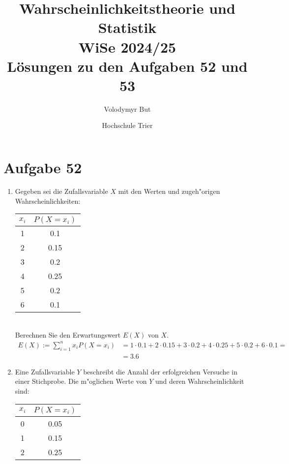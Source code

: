 \documentclass[10pt, oneside]{article}
\title{Wahrscheinlichkeitstheorie und Statistik\\[10pt]\Large{WiSe 2024/25}\\[15pt]\Large{L{\"o}sungen zu den Aufgaben 52 und 53}}
\author{Volodymyr But}
\date{Hochschule Trier}
\begin{document}
\sloppy

\maketitle
\vspace{25px}

\section{Aufgabe 52}

\begin{enumerate}
    \item Gegeben sei die Zufallsvariable $X$ mit den Werten und zugeh"origen Wahrscheinlichkeiten:
        \begin{table*}[h]
            \centering
            \begin{tabular}{c|c}
                $x_i$ & $P(X = x_i)$ \\
                \hline
                1 & 0.1 \\
                2 & 0.15 \\
                3 & 0.2 \\
                4 & 0.25 \\
                5 & 0.2 \\
                6 & 0.1
            \end{tabular}
        \end{table*} \\
        Berechnen Sie den Erwartungswert $E(X)$ von $X$.
        \begin{align*}
            E(X) := \sum_{i = 1}^n x_iP(X = x_i) &= 1 \cdot 0.1 + 2 \cdot 0.15 + 3 \cdot 0.2 + 4 \cdot 0.25 + 5 \cdot 0.2 + 6 \cdot 0.1 = \\
                                                 &= 3.6
        \end{align*}
    \item Eine Zufallsvariable $Y$ beschreibt die Anzahl der erfolgreichen
        Versuche in einer Stichprobe. Die m"oglichen Werte von $Y$ und deren
        Wahrscheinlichkeit sind:
        \begin{table*}[h]
            \centering
            \begin{tabular}{c|c}
                $x_i$ & $P(X = x_i)$ \\
                \hline
                0 & 0.05 \\
                1 & 0.15 \\
                2 & 0.25 \\

\end{tabular}
\end{table*}
\end{enumerate}
\end{document}
